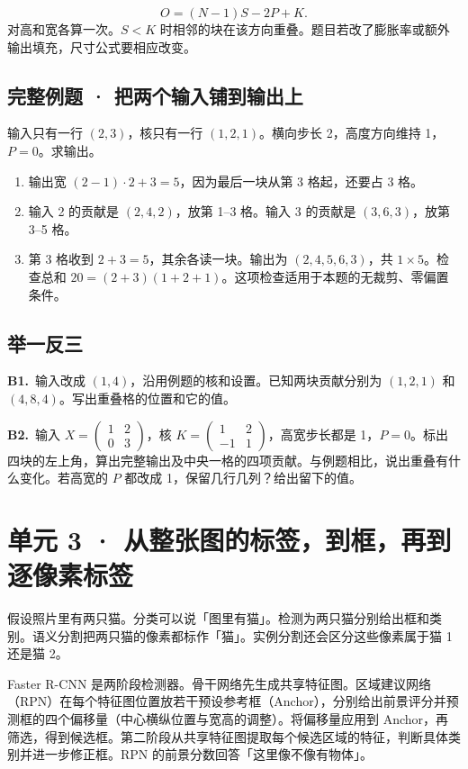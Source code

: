 \documentclass[UTF8,a4paper,11pt]{ctexart}
\newcommand{\CompactQuestion}[2]{\par\noindent\textbf{#1.}\ #2\par\vspace{.8em}}
\begin{document}
\[O=(N-1)S-2P+K.\]
对高和宽各算一次。$S<K$ 时相邻的块在该方向重叠。题目若改了膨胀率或额外输出填充，尺寸公式要相应改变。

\subsection{完整例题 · 把两个输入铺到输出上}
输入只有一行 $(2,3)$，核只有一行 $(1,2,1)$。横向步长 2，高度方向维持 1，$P=0$。求输出。

\begin{enumerate}
\item 输出宽 $(2-1)\cdot2+3=5$，因为最后一块从第 3 格起，还要占 3 格。
\item 输入 2 的贡献是 $(2,4,2)$，放第 1–3 格。输入 3 的贡献是 $(3,6,3)$，放第 3–5 格。
\item 第 3 格收到 $2+3=5$，其余各读一块。输出为 $(2,4,5,6,3)$，共 $1\times5$。检查总和 $20=(2+3)(1+2+1)$。这项检查适用于本题的无裁剪、零偏置条件。
\end{enumerate}
\subsection{举一反三}
\CompactQuestion{B1}{输入改成 $(1,4)$，沿用例题的核和设置。已知两块贡献分别为 $(1,2,1)$ 和 $(4,8,4)$。写出重叠格的位置和它的值。}
\CompactQuestion{B2}{输入 $X=\begin{pmatrix}1&2\\0&3\end{pmatrix}$，核 $K=\begin{pmatrix}1&2\\-1&1\end{pmatrix}$，高宽步长都是 1，$P=0$。标出四块的左上角，算出完整输出及中央一格的四项贡献。与例题相比，说出重叠有什么变化。若高宽的 $P$ 都改成 1，保留几行几列？给出留下的值。}
\clearpage
\section{单元 3 · 从整张图的标签，到框，再到逐像素标签}
假设照片里有两只猫。分类可以说「图里有猫」。检测为两只猫分别给出框和类别。语义分割把两只猫的像素都标作「猫」。实例分割还会区分这些像素属于猫 1 还是猫 2。

Faster R-CNN 是两阶段检测器。骨干网络先生成共享特征图。区域建议网络（RPN）在每个特征图位置放若干预设参考框（Anchor），分别给出前景评分并预测框的四个偏移量（中心横纵位置与宽高的调整）。将偏移量应用到 Anchor，再筛选，得到候选框。第二阶段从共享特征图提取每个候选区域的特征，判断具体类别并进一步修正框。RPN 的前景分数回答「这里像不像有物体」。
\end{document}
